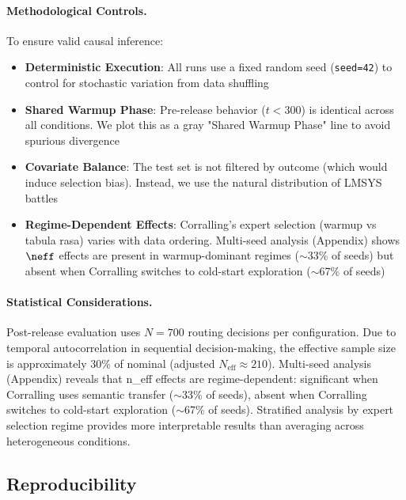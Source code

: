 \paragraph{Methodological Controls.}
To ensure valid causal inference:
\begin{itemize}[leftmargin=*, itemsep=2pt]
    \item \textbf{Deterministic Execution}: All runs use a fixed random seed (\texttt{seed=42}) to control for stochastic variation from data shuffling
    
    \item \textbf{Shared Warmup Phase}: Pre-release behavior ($t < 300$) is identical across all conditions. We plot this as a gray "Shared Warmup Phase" line to avoid spurious divergence
    
    \item \textbf{Covariate Balance}: The test set is not filtered by outcome (which would induce selection bias). Instead, we use the natural distribution of LMSYS battles
    
    \item \textbf{Regime-Dependent Effects}: Corralling's expert selection (warmup vs tabula rasa) varies with data ordering. Multi-seed analysis (Appendix) shows $\neff$ effects are present in warmup-dominant regimes ($\sim$33\% of seeds) but absent when Corralling switches to cold-start exploration ($\sim$67\% of seeds)
\end{itemize}

\paragraph{Statistical Considerations.}
Post-release evaluation uses $N=700$ routing decisions per configuration. Due to temporal autocorrelation in sequential decision-making, the effective sample size is approximately 30\% of nominal (adjusted $N_{\text{eff}} \approx 210$). Multi-seed analysis (Appendix) reveals that n_eff effects are regime-dependent: significant when Corralling uses semantic transfer ($\sim$33\% of seeds), absent when Corralling switches to cold-start exploration ($\sim$67\% of seeds). Stratified analysis by expert selection regime provides more interpretable results than averaging across heterogeneous conditions.

\subsection{Reproducibility}
\label{sec:reproducibility}

